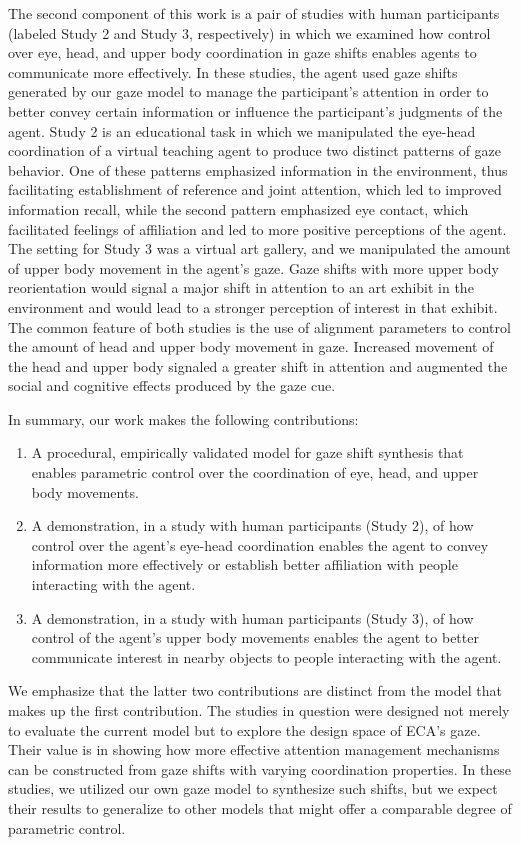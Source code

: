 The second component of this work is a pair of studies with human participants (labeled Study 2 and Study 3, respectively) in which we examined how control over eye, head, and upper body coordination in gaze shifts enables agents to communicate more effectively. In these studies, the agent used gaze shifts generated by our gaze model to manage the participant's attention in order to better convey certain information or influence the participant's judgments of the agent. Study 2 is an educational task in which we manipulated the eye-head coordination of a virtual teaching agent to produce two distinct patterns of gaze behavior. One of these patterns emphasized information in the environment, thus facilitating establishment of reference and joint attention, which led to improved information recall, while the second pattern emphasized eye contact, which facilitated feelings of affiliation and led to more positive perceptions of the agent. The setting for Study 3 was a virtual art gallery, and we manipulated the amount of upper body movement in the agent's gaze. Gaze shifts with more upper body reorientation would signal a major shift in attention to an art exhibit in the environment and would lead to a stronger perception of interest in that exhibit. The common feature of both studies is the use of alignment parameters to control the amount of head and upper body movement in gaze. Increased movement of the head and upper body signaled a greater shift in attention and augmented the social and cognitive effects produced by the gaze cue.

In summary, our work makes the following contributions:
\begin{enumerate}
\item A procedural, empirically validated model for gaze shift synthesis that enables parametric control over the coordination of eye, head, and upper body movements.
\item A demonstration, in a study with human participants (Study 2), of how control over the agent's eye-head coordination enables the agent to convey information more effectively or establish better affiliation with people interacting with the agent.
\item A demonstration, in a study with human participants (Study 3), of how control of the agent's upper body movements enables the agent to better communicate interest in nearby objects to people interacting with the agent.
\end{enumerate} 

We emphasize that the latter two contributions are distinct from the model that makes up the first contribution. The studies in question were designed not merely to evaluate the current model but to explore the design space of ECA's gaze. Their value is in showing how more effective attention management mechanisms can be constructed from gaze shifts with varying coordination properties. In these studies, we utilized our own gaze model to synthesize such shifts, but we expect their results to generalize to other models that might offer a comparable degree of parametric control.